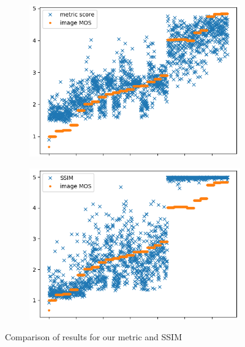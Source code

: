 \documentclass{article}
\begin{document}
\begin{figure}
\centering
\begin{subfigure}{4.4cm}
  \centering
  \includegraphics[width=0.98\linewidth]{figures/ss_good_small}
  \caption{}
\end{subfigure}%
\begin{subfigure}{4.4cm}
  \centering
  \includegraphics[width=0.98\linewidth]{figures/ssim_good_small}
  \caption{}
\end{subfigure}
\caption{Comparison of results for our metric and SSIM\label{fig:scores}}
\end{figure}
\end{document}
